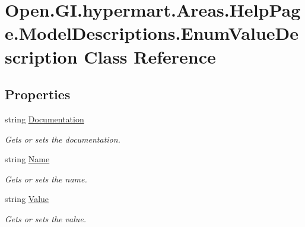 \hypertarget{class_open_1_1_g_i_1_1hypermart_1_1_areas_1_1_help_page_1_1_model_descriptions_1_1_enum_value_description}{}\section{Open.\+G\+I.\+hypermart.\+Areas.\+Help\+Page.\+Model\+Descriptions.\+Enum\+Value\+Description Class Reference}
\label{class_open_1_1_g_i_1_1hypermart_1_1_areas_1_1_help_page_1_1_model_descriptions_1_1_enum_value_description}


 


\subsection*{Properties}
\begin{DoxyCompactItemize}
\item 
string \hyperlink{class_open_1_1_g_i_1_1hypermart_1_1_areas_1_1_help_page_1_1_model_descriptions_1_1_enum_value_description_a8e1e8adc9b367cdc6034e648067585c9}{Documentation}
\begin{DoxyCompactList}\small\item\em Gets or sets the documentation. \end{DoxyCompactList}\item 
string \hyperlink{class_open_1_1_g_i_1_1hypermart_1_1_areas_1_1_help_page_1_1_model_descriptions_1_1_enum_value_description_a9a7f37f9e6c2a01c41a557b7a8e65d4e}{Name}
\begin{DoxyCompactList}\small\item\em Gets or sets the name. \end{DoxyCompactList}\item 
string \hyperlink{class_open_1_1_g_i_1_1hypermart_1_1_areas_1_1_help_page_1_1_model_descriptions_1_1_enum_value_description_ab94229a6c9c5afad58abc04d705169f8}{Value}
\begin{DoxyCompactList}\small\item\em Gets or sets the value. \end{DoxyCompactList}\end{DoxyCompactItemize}


